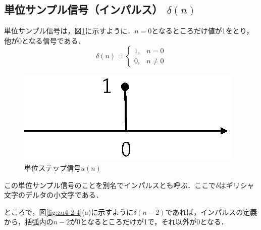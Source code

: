 \subsection{単位サンプル信号（インパルス） $\delta (n)$}

単位サンプル信号は，図\ref{fig:zu4-2-31}に示すように．$n=0$となるところだけ値が1をとり，他が0となる信号である．
\begin{equation}
\delta (n) = \left \{ 
\begin{array}{cc}
1, & n = 0 \\
0, & n \neq 0
\end{array}
\right .
\end{equation}

\begin{figure}[H]
\begin{center}
\begin{minipage}{.48\textwidth}
\begin{center}
\includegraphics[width=.95\textwidth]{fig/zu-2-4-a.eps}

\end{center}
\end{minipage}

\end{center}
\caption{単位ステップ信号$u(n)$}
\label{fig:zu4-2-31}
\end{figure}


この単位サンプル信号のことを別名でインパルスとも呼ぶ．ここで$\delta$はギリシャ文字のデルタの小文字である．


ところで，図\ref{fig:zu4-2-4}(a)に示すように$\delta(n-2)$であれば，インパルスの定義から，括弧内の$n-2$が0となるところだけが1で，それ以外が0となる．

